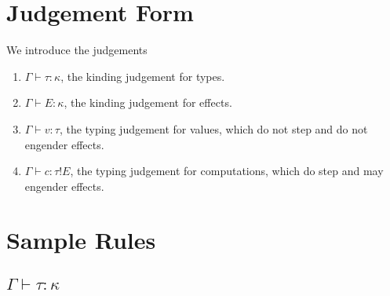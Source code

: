 \documentclass[12pt]{article}
\begin{document}
\newpage
\section{Judgement Form}

We introduce the judgements
\begin{enumerate}
\item $\Gamma \vdash \tau : \kappa$, the kinding judgement for types.
\item $\Gamma \vdash E : \kappa$, the kinding judgement for effects.
\item $\Gamma \vdash v : \tau$, the typing judgement for values, which do not
step and do not engender effects.
\item $\Gamma \vdash c : \tau!E$, the typing judgement for computations, which
do step and may engender effects.
\end{enumerate}

\newpage
\section{Sample Rules}

\subsection{$\Gamma \vdash \tau : \kappa$}
\end{document}
